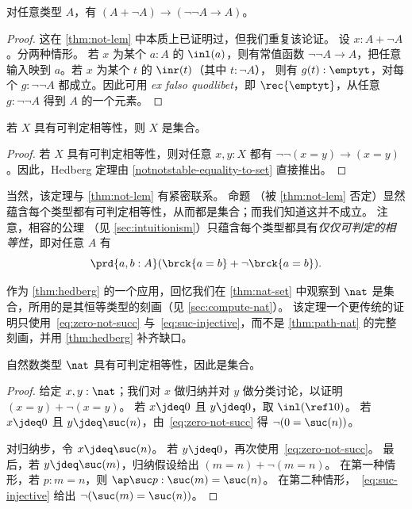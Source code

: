 \begin{lem}\label{lem:hedberg-helper}
对任意类型 $A$，有 $(A+\neg A)\to(\neg\neg A\to A)$。
\end{lem}

\begin{proof}
这在 \cref{thm:not-lem} 中本质上已证明过，但我们重复该论证。
设 $x:A+\neg A$。分两种情形。
若 $x$ 为某个 $a:A$ 的 $\inl(a)$，则有常值函数 $\neg\neg A
\to A$，把任意输入映到 $a$。若 $x$ 为某个 $t$ 的 $\inr(t)$（其中 $t:\neg A$），
则有 $g(t):\emptyt$，对每个 $g:\neg\neg A$ 都成立。因此可用
\emph{ex falso quodlibet}，即 $\rec{\emptyt}$，从任意 $g:\neg\neg A$ 得到 $A$ 的一个元素。
\end{proof}

\begin{thm}[Hedberg]\label{thm:hedberg}
  若 $X$ 具有可判定相等性，则 $X$ 是集合。
\end{thm}

\begin{proof}
若 $X$ 具有可判定相等性，则对任意
$x,y:X$ 都有 $\neg\neg(x=y)\to(x=y)$。因此，Hedberg 定理由
\cref{notnotstable-equality-to-set} 直接推出。
\end{proof}

当然，该定理与 \cref{thm:not-lem} 有紧密联系。
命题 \LEM{\infty}（被 \cref{thm:not-lem} 否定）显然蕴含每个类型都有可判定相等性，从而都是集合；而我们知道这并不成立。
%
注意，相容的公理 \LEM{}（见 \cref{sec:intuitionism}）只蕴含每个类型都具有\emph{仅仅可判定的相等性}，即对任意 $A$ 有
%
%
\[ \prd{a,b:A} (\brck{a=b} + \neg\brck{a=b}). \]

%

作为 \cref{thm:hedberg} 的一个应用，回忆我们在 \cref{thm:nat-set} 中观察到 $\nat$ 是集合，所用的是其恒等类型的刻画（见
\cref{sec:compute-nat}）。
该定理一个更传统的证明只使用~\eqref{eq:zero-not-succ} 与~\eqref{eq:suc-injective}，而不是
\cref{thm:path-nat} 的完整刻画，并用 \cref{thm:hedberg} 补齐缺口。

\begin{thm}\label{prop:nat-is-set}
 自然数类型 $\nat$ 具有可判定相等性，因此是集合。
\end{thm}

\begin{proof}
  给定 $x, y : \nat$；我们对 $x$ 做归纳并对 $y$ 做分类讨论，以证明 $(x=y)+\neg(x=y)$。
  若 $x \jdeq 0$ 且 $y \jdeq 0$，取 $\inl(\refl0)$。
  若 $x \jdeq 0$ 且 $y \jdeq \suc(n)$，由~\eqref{eq:zero-not-succ} 得 $\neg (0 = \suc (n))$。

  对归纳步，令 $x \jdeq \suc (n)$。
  若 $y \jdeq 0$，再次使用~\eqref{eq:zero-not-succ}。
  最后，若 $y \jdeq \suc (m)$，归纳假设给出 $(m = n)+\neg(m = n)$。
  在第一种情形，若 $p:m=n$，则 $\ap \suc p:\suc(m)=\suc(n)$。
  在第二种情形，~\eqref{eq:suc-injective} 给出 $\neg(\suc(m)=\suc(n))$。
\end{proof}

